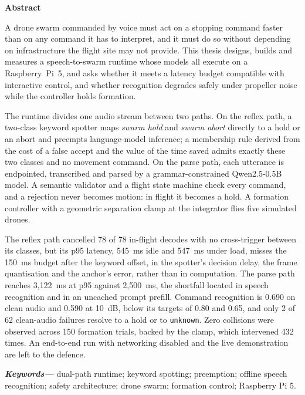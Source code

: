 \thispagestyle{empty}
\vspace*{4cm}
\begin{center}{\Huge\bfseries Abstract}\end{center}
\vskip 1cm
\noindent A drone swarm commanded by voice must act on a stopping command faster than on any command
it has to interpret, and it must do so without depending on infrastructure the flight site may not
provide. This thesis designs, builds and measures a speech-to-swarm runtime whose models all execute
on a Raspberry~Pi~5, and asks whether it meets a latency budget compatible with interactive control,
and whether recognition degrades safely under propeller noise while the controller holds formation.

\vspace{0.3cm}
\noindent The runtime divides one audio stream between two paths. On the reflex path, a two-class
keyword spotter maps \emph{swarm hold} and \emph{swarm abort} directly to a hold or an abort and
preempts language-model inference; a membership rule derived from the cost of a false accept and the
value of the time saved admits exactly these two classes and no movement command. On the parse path,
each utterance is endpointed, transcribed and parsed by a grammar-constrained Qwen2.5-0.5B model. A
semantic validator and a flight state machine check every command, and a rejection never becomes
motion: in flight it becomes a hold. A formation controller with a geometric separation clamp at the
integrator flies five simulated drones.

\vspace{0.3cm}
\noindent The reflex path cancelled 78 of 78 in-flight decodes with no cross-trigger between its
classes, but its p95 latency, 545~ms idle and 547~ms under load, misses the 150~ms budget after the
keyword offset, in the spotter's decision delay, the frame quantisation and the anchor's error,
rather than in computation. The parse path reaches 3{,}122~ms at
p95 against 2{,}500~ms, the shortfall located in speech recognition and in an uncached prompt
prefill. Command recognition is 0.690 on clean audio and 0.590 at 10~dB, below its targets of 0.80
and 0.65, and only 2 of 62 clean-audio failures resolve to a hold or to \texttt{unknown}. Zero
collisions were observed across 150 formation trials, backed by the clamp, which intervened 432
times. An end-to-end run with networking disabled and the live demonstration are left to the
defence.

\vspace{1cm}
\providecommand{\keywords}[1]{\textbf{\textit{Keywords---}} #1}
\keywords{dual-path runtime; keyword spotting; preemption; offline speech recognition;
safety architecture; drone swarm; formation control; Raspberry Pi 5.}
\newpage
